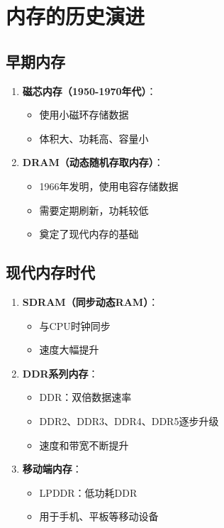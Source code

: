 \documentclass[12pt,UTF8]{ctexbook}
\begin{document}
\chapter{内存的历史演进}

\section{早期内存}

\begin{enumerate}
    \item \textbf{磁芯内存（1950-1970年代）}：
    \begin{itemize}[leftmargin=2em]
        \item 使用小磁环存储数据
        \item 体积大、功耗高、容量小
    \end{itemize}
    
    \item \textbf{DRAM（动态随机存取内存）}：
    \begin{itemize}[leftmargin=2em]
        \item 1966年发明，使用电容存储数据
        \item 需要定期刷新，功耗较低
        \item 奠定了现代内存的基础
    \end{itemize}
\end{enumerate}

\section{现代内存时代}

\begin{enumerate}
    \item \textbf{SDRAM（同步动态RAM）}：
    \begin{itemize}[leftmargin=2em]
        \item 与CPU时钟同步
        \item 速度大幅提升
    \end{itemize}
    
    \item \textbf{DDR系列内存}：
    \begin{itemize}[leftmargin=2em]
        \item DDR：双倍数据速率
        \item DDR2、DDR3、DDR4、DDR5逐步升级
        \item 速度和带宽不断提升
    \end{itemize}
    
    \item \textbf{移动端内存}：
    \begin{itemize}[leftmargin=2em]
        \item LPDDR：低功耗DDR
        \item 用于手机、平板等移动设备
    \end{itemize}
\end{enumerate}
\end{document}
